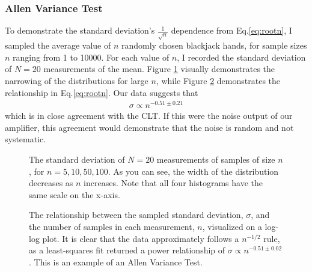 \documentclass[12pt]{article}
\begin{document}
\subsubsection*{Allen Variance Test}
To demonstrate the standard deviation's $\frac{1}{\sqrt{n}}$ dependence from Eq.\ref{eq:rootn}, I sampled the average value of $n$ randomly chosen blackjack hands, for sample sizes $n$ ranging from 1 to 10000. For each value of $n$, I recorded the standard deviation of $N=20$ measurements of the mean. Figure \ref{fig:n_scaling} visually demonstrates the narrowing of the distributions for large $n$, while Figure \ref{fig:n_scaling2} demonstrates the relationship in Eq.\ref{eq:rootn}. Our data suggests that
\begin{eqnarray}
\sigma \propto n^{-0.51 \pm 0.21} \nonumber
\end{eqnarray}
which is in close agreement with the CLT. If this were the noise output of our amplifier, this agreement would demonstrate that the noise is random and not systematic. 
\begin{figure}[H]
\caption[SODUMB]{The standard deviation of $N=20$ measurements of samples of size $n$, for $n=5,10,50,100$. As you can see, the width of the distribution decreases as $n$ increases. Note that all four histograms have the same scale on the x-axis.}
\label{fig:n_scaling}
\end{figure}
\begin{figure}[H]
\caption[SODUMB]{The relationship between the sampled standard deviation, $\sigma$, and the number of samples in each measurement, $n$, visualized on a log-log plot. It is clear that the data approximately follows a $n^{-1/2}$ rule, as a least-squares fit returned a power relationship of $\sigma \propto n^{-0.51\pm0.02}$. This is an example of an Allen Variance Test.}
\label{fig:n_scaling2}
\end{figure}
\end{document}
